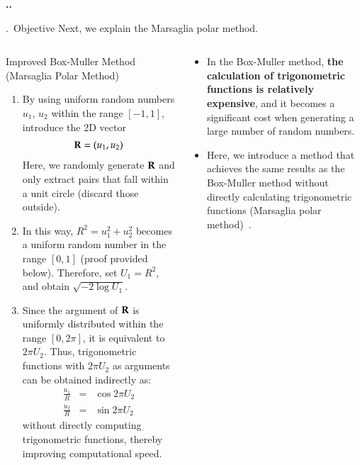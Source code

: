 \documentclass[aspectratio=169,dvipdfmx,cjk,handout,hyperref,8pt]{beamer} %
\newcommand{\TK}[1]{{\bf \color{red} #1}}
\theoremstyle{example}
\newcommand{\bi}{\begin{itemize}}
\newcommand{\ei}{\end{itemize}}
\begin{document}
\begin{frame}{\bf\thesection.\thesubsection.~\insertsubsection}  
\begin{block}{\thesection.\thesubsection~Objective}
Next, we explain the Marsaglia polar method.
\end{block}

\begin{columns}
\begin{column}{60mm}
\begin{exampleblock}{Improved Box-Muller Method (Marsaglia Polar Method)~\cite{Marsaglia1964SIAMRev.a}}
{\small
\begin{enumerate}
\item By using uniform random numbers $u_1$, $u_2$ within the range $[-1, 1]$, introduce the 2D vector
\begin{eqnarray}
{\bf R}=(u_1,u_2)
\end{eqnarray}
Here, we randomly generate ${\bf R}$ and only extract pairs that fall within a unit circle (discard those outside).
\item In this way, $R ^2 = u_1 ^2 + u_2^2 $ becomes a uniform random number in the range $[0, 1]$ (proof provided below).
Therefore, set $U_1 = R^2$, and obtain $\sqrt {-2 \log {U_1}}$. 
\item Since the argument of ${\bf R}$ is uniformly distributed within the range $[0,2\pi]$, it is equivalent to $2\pi U_2$. 
Thus, trigonometric functions with $2\pi U_2$ as arguments can be obtained indirectly as:
\begin{eqnarray}
\frac{u_1}{R}&=&\cos{2\pi U_2}\\  
\frac{u_2}{R}&=&\sin{2\pi U_2}
\end{eqnarray}
without directly computing trigonometric functions, thereby improving computational speed.
\end{enumerate}}
\end{exampleblock}
\end{column}
\begin{column}{50mm}
\bi
\item In the Box-Muller method, \TK{the calculation of trigonometric functions is relatively expensive}, and it becomes a significant cost when generating a large number of random numbers. 
\item Here, we introduce a method that achieves the same results as the Box-Muller method without directly calculating trigonometric functions (Marsaglia polar method)~\cite{Marsaglia1964SIAMRev.a}.
\ei
\end{column}
\end{columns}


\end{frame}
\end{document}

